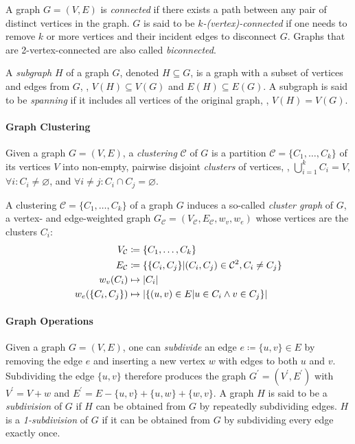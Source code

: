 A graph $G = (V, E)$ is \emph{connected} if there exists a path between any pair of distinct vertices in the graph.
$G$ is said to be \emph{$k$-(vertex)-connected} if one needs to remove $k$ or more vertices and their incident edges to disconnect $G$.
Graphs that are 2-vertex-connected are also called \emph{biconnected}.

A \emph{subgraph} $H$ of a graph $G$, denoted $H \subseteq G$, is a graph with a subset of vertices and edges from $G$, \ie{}, $V(H) \subseteq V(G)$ and $E(H) \subseteq E(G)$.
A subgraph is said to be \emph{spanning} if it includes all vertices of the original graph, \ie{}, $V(H) = V(G)$.


\paragraph{Graph Clustering}

Given a graph $G = (V, E)$, a \emph{clustering} $\mathcal{C}$ of $G$ is a partition $\mathcal{C} = \{C_1, \dots, C_k\}$ of its vertices $V$ into non-empty, pairwise disjoint \emph{clusters} of vertices, \ie{}, $\bigcup_{i=1}^k C_i = V$, $\forall i \colon C_i \neq \varnothing$, and $\forall i \neq j \colon C_i \cap C_j = \varnothing$.

A clustering $\mathcal{C} = \{ C_1, \dots, C_k \}$ of a graph $G$ induces a so-called \emph{cluster graph} of $G$, a vertex- and edge-weighted graph $G_\mathcal{C} = (V_\mathcal{C}, E_\mathcal{C}, w_v, w_e)$ whose vertices are the clusters $C_i$:
%
\begin{align*}
V_\mathcal{C} &\coloneqq \{ C_1, \dots, C_k \} \\
E_\mathcal{C} &\coloneqq \{ \{C_i, C_j\} \vert (C_i, C_j) \in \mathcal{C}^2, C_i \neq C_j \} \\
w_v(C_i) &\mapsto \left\lvert C_i\right\rvert \\
w_e(\{C_i, C_j\}) &\mapsto \left\lvert\{ (u,v) \in E \vert u \in C_i \land v \in C_j \}\right\rvert
\end{align*}



\paragraph{Graph Operations}


Given a graph $G = (V, E)$, one can \emph{subdivide} an edge $e \coloneqq \{u,v\} \in E$ by removing the edge $e$ and inserting a new vertex $w$ with edges to both $u$ and $v$.
Subdividing the edge $\{u,v\}$ therefore produces the graph $G^\prime = (V^\prime, E^\prime)$ with $V^\prime = V + w$ and $E^\prime = E - \{u,v\} + \{u,w\} + \{w,v\}$.
A graph $H$ is said to be a \emph{subdivision} of $G$ if $H$ can be obtained from $G$ by repeatedly subdividing edges.
$H$ is a \emph{1-subdivision} of $G$ if it can be obtained from $G$ by subdividing every edge exactly once.

